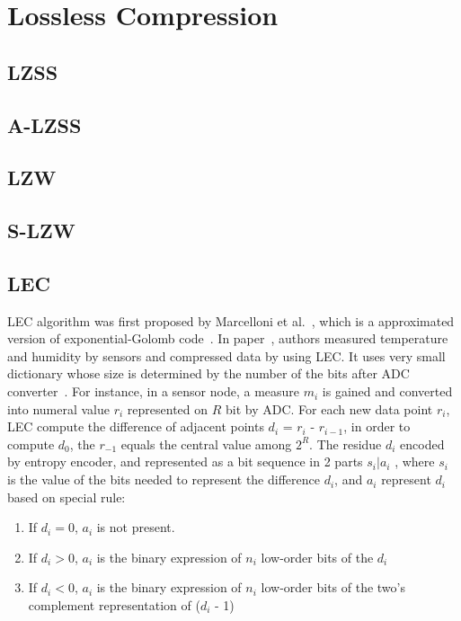 \section{Lossless Compression}
\subsection{LZSS}
\subsection{A-LZSS}

\subsection{LZW}
\subsection{S-LZW}

\subsection{LEC}
LEC algorithm was first proposed by Marcelloni et
al.~\cite{marcelloni2008simple}, which is a approximated version of
exponential-Golomb code~\cite{teuhola1978compression}. In
paper~\cite{marcelloni2008simple}, authors measured temperature and humidity by
sensors and compressed data by using LEC. It uses very small dictionary whose
size is determined by the number of the bits after ADC
converter~\cite{marcelloni2008simple,marcelloni2009efficient}.  For instance, in
a sensor node, a measure $m_i$ is gained and converted into numeral value $r_i$
represented on $R$ bit by ADC. For each new data point $r_i$, LEC compute the
difference of adjacent points $d_i$ = $r_i$ - $r_{i-1}$, in order to compute
$d_0$, the $r_{-1}$ equals the central value among $2^R$. The residue $d_i$
encoded by entropy encoder, and represented as a bit sequence in 2 parts $s_i |
a_i$ , where $s_i$ is the value of the bits needed to represent the difference
$d_i$, and $a_i$ represent $d_i$ based on special rule:
\begin{enumerate}
    \item If $d_i = 0$, $a_i$ is not present.    
    \item If $d_i > 0$, $a_i$ is the binary expression of $n_i$ low-order bits
    of the $d_i$
    \item If $d_i < 0$, $a_i$ is the binary expression of $n_i$ low-order bits
    of the two's complement representation of ($d_i$ - 1)
\end{enumerate}

